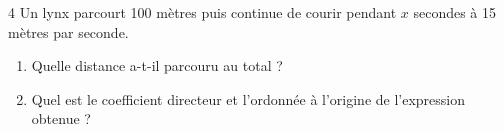 \begin{frame}{4\vspace{-32pt}}
	Un lynx parcourt 100 mètres puis continue de courir pendant $x$ secondes à 15 mètres par seconde.
	
	\begin{enumerate}
		\item Quelle distance a-t-il parcouru au total ? 
		\item Quel est le coefficient directeur et l'ordonnée à l'origine de l'expression obtenue ?
	\end{enumerate}
\end{frame}


